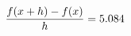 \documentclass[preview]{standalone}
\begin{document}
\begin{align*}
\special{dvisvgm:raw <g id='unique000'>}\frac{f(x+h)-f(x)}{h} = 5.084\special{dvisvgm:raw </g>}
\end{align*}
\end{document}
